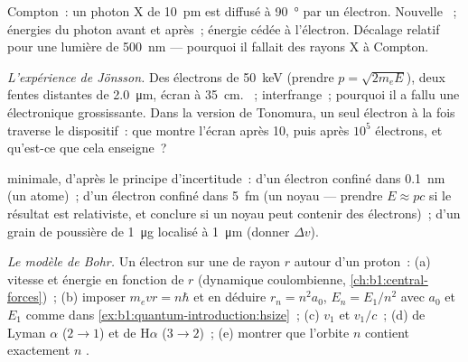 \begin{exercise}[$\star\star$]\label{exo:b1:quantum-introduction:6}
Compton~: un photon X de \qty{10}{pm} est diffusé à \qty{90}{\degree} par un
électron. Nouvelle ~; énergies du photon avant et après~;
énergie cédée à l'électron. Décalage relatif pour une lumière de
\qty{500}{nm} --- pourquoi il fallait des rayons X à Compton.
\end{exercise}

\begin{exercise}[$\star\star$]\label{exo:b1:quantum-introduction:7}
\emph{L'expérience de Jönsson.} Des électrons de \qty{50}{keV} (prendre $p =
\sqrt{2m_eE}$), deux fentes distantes de \qty{2.0}{\micro m}, écran à
\qty{35}{cm}. ~; interfrange~; pourquoi il a fallu une
 électronique grossissante. Dans la version de Tonomura, un seul
électron à la fois traverse le dispositif~: que montre l'écran après 10,
puis après $10^5$ électrons, et qu'est-ce que cela enseigne~?
\end{exercise}

\begin{exercise}[$\star\star$]\label{exo:b1:quantum-introduction:8}
 minimale, d'après le principe d'incertitude~: d'un
électron confiné dans \qty{0.1}{nm} (un atome)~; d'un électron confiné dans
\qty{5}{fm} (un noyau --- prendre $E \approx pc$ si le résultat est
relativiste, et conclure si un noyau peut contenir des électrons)~; d'un
grain de poussière de \qty{1}{\micro g} localisé à \qty{1}{\micro m} (donner $\Delta v$).
\end{exercise}

\begin{exercise}[$\star\star$]\label{exo:b1:quantum-introduction:9}
\emph{Le modèle de Bohr.} Un électron sur une  de rayon $r$
autour d'un proton~: (a) vitesse et énergie en fonction de $r$ (dynamique
coulombienne, \cref{ch:b1:central-forces})~; (b) imposer $m_evr = n\hbar$ et en déduire
$r_n = n^2a_0$, $E_n = E_1/n^2$ avec $a_0$ et $E_1$ comme dans
\cref{ex:b1:quantum-introduction:hsize}~; (c) $v_1$ et $v_1/c$~; (d)
 de Lyman $\alpha$ ($2 \to 1$) et de H$\alpha$ ($3 \to 2$)~;
(e) montrer que l'orbite $n$ contient exactement $n$ .
\end{exercise}

